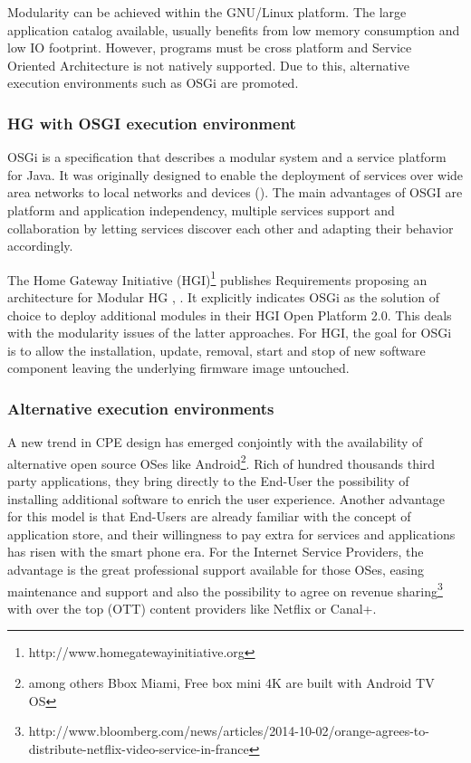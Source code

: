 Modularity can be achieved within the GNU/Linux platform.
The large application catalog available, usually benefits from low memory consumption and low IO footprint.
However, programs must be cross platform and Service Oriented Architecture is not natively supported.
Due to this, alternative execution environments such as OSGi are promoted.


   
\subsubsection{HG with OSGI execution environment}
   
OSGi is a specification that describes a modular system and a service platform for Java.
It was originally designed to enable the deployment of services over wide area networks to local networks and devices (\cite{marples_open_2001}).
The main advantages of OSGI are platform and application independency, multiple services support and collaboration by letting services discover each other and adapting their behavior accordingly.

The Home Gateway Initiative (HGI)\footnote{http://www.homegatewayinitiative.org} publishes Requirements  proposing an architecture for Modular HG \cite{_requirements_2011}, \cite{_hg_2014}.
It explicitly indicates OSGi as the solution of choice to deploy additional modules in their HGI Open Platform 2.0.
This deals with the modularity issues of the latter approaches.
For HGI, the goal for OSGi is to allow the installation, update, removal, start and stop of new software component leaving the underlying firmware image untouched.

\subsubsection{Alternative execution environments}

A new trend in CPE design has emerged conjointly with the availability of alternative open source OSes like Android\footnote{among others Bbox Miami, Free box mini 4K are built with Android TV OS}.
Rich of hundred thousands third party applications, they bring directly to the End-User the possibility of installing additional software to enrich the user experience.
Another advantage for this model is that End-Users are already familiar with the concept of application store, and their willingness to pay extra for services and applications has risen with the smart phone era.
For the Internet Service Providers, the advantage is the great professional support available for those OSes, easing maintenance and support and also the possibility to agree on revenue sharing\footnote{http://www.bloomberg.com/news/articles/2014-10-02/orange-agrees-to-distribute-netflix-video-service-in-france} with over the top (OTT) content providers like Netflix or Canal+.

